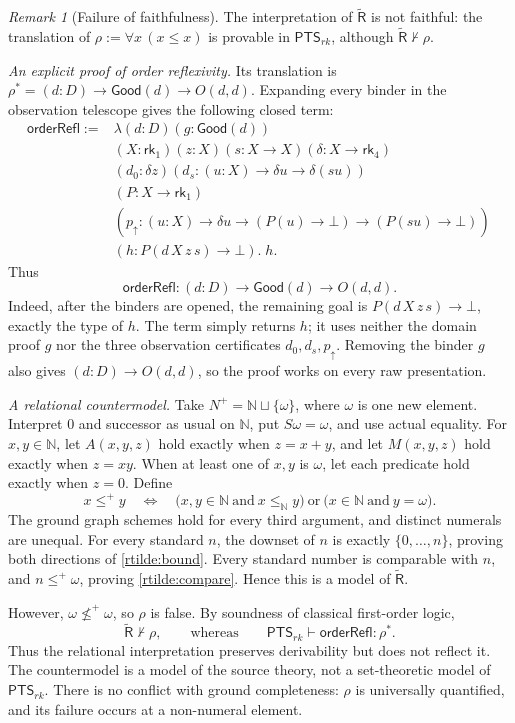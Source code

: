 \documentclass[11pt,a4paper]{article}
\newcommand{\rk}[1]{\mathsf{rk}_{#1}}
\newcommand{\PTS}{\mathsf{PTS}_{rk}}
\newcommand{\Rt}{\widetilde{\mathsf R}}
\newcommand{\Good}{\mathsf{Good}}
\theoremstyle{remark}\newtheorem*{remark}{Remark}
\begin{document}
\begin{remark}[Failure of faithfulness]\label{rem:relational-nonfaithful}
The interpretation of $\Rt$ is not faithful: the translation of
$\rho:=\forall x\,(x\le x)$ is provable in $\PTS$, although $\Rt\nvdash\rho$.

\emph{An explicit proof of order reflexivity.}
Its translation is
$\rho^*=(d:D)\to\Good(d)\to O(d,d)$. Expanding every binder in the
observation telescope gives the following closed term:
\[
\begin{aligned}
 \mathsf{orderRefl}:={}&\lambda(d:D)(g:\Good(d))\,\\
 &(X:\rk1)(z:X)(s:X\to X)(\delta:X\to\rk4)\,\\
 &(d_0:\delta z)(d_s:(u:X)\to\delta u\to\delta(su))\,\\
 &(P:X\to\rk1)\,\\
 &(p_{\uparrow}:(u:X)\to\delta u\to
       (P(u)\to\bot)\to(P(su)\to\bot))\,\\
 &(h:P(d\,X\,z\,s)\to\bot).\;h.
\end{aligned}
\]
Thus
\begin{equation}
 \mathsf{orderRefl}:(d:D)\to\Good(d)\to O(d,d).
 \label{eq:order-reflexivity}
\end{equation}
Indeed, after the binders are opened, the remaining goal is
$P(d\,X\,z\,s)\to\bot$, exactly the type of $h$. The term simply returns
$h$; it uses neither the domain proof $g$ nor the three observation
certificates $d_0,d_s,p_{\uparrow}$. Removing the binder $g$ also gives
$(d:D)\to O(d,d)$, so the proof works on every raw presentation.

\emph{A relational countermodel.}
Take $N^+=\mathbb N\sqcup\{\omega\}$, where $\omega$ is one new element.
Interpret $0$ and successor as usual on $\mathbb N$, put $S\omega=\omega$,
and use actual equality. For $x,y\in\mathbb N$, let $A(x,y,z)$ hold exactly
when $z=x+y$, and let $M(x,y,z)$ hold exactly when $z=xy$. When at least one
of $x,y$ is $\omega$, let each predicate hold exactly when $z=0$. Define
\[
 x\le^+ y\quad\Longleftrightarrow\quad
 \bigl(x,y\in\mathbb N\ \text{and}\ x\le_{\mathbb N}y\bigr)
 \ \text{or}\ \bigl(x\in\mathbb N\ \text{and}\ y=\omega\bigr).
\]
The ground graph schemes hold for every third argument, and distinct numerals
are unequal. For every standard $n$, the downset of $n$ is exactly
$\{0,\ldots,n\}$, proving both directions of \eqref{rtilde:bound}.
Every standard number is comparable with $n$, and $n\le^+\omega$, proving
\eqref{rtilde:compare}. Hence this is a model of $\Rt$.

However, $\omega\not\le^+\omega$, so $\rho$ is false. By soundness of
classical first-order logic,
\[
 \Rt\nvdash\rho,
 \qquad\text{whereas}\qquad \PTS\vdash\mathsf{orderRefl}:\rho^*.
\]
Thus the relational interpretation preserves derivability but does not
reflect it. The countermodel is a model of the source theory, not a
set-theoretic model of $\PTS$. There is no conflict with ground completeness:
$\rho$ is universally quantified, and its failure occurs at a non-numeral
element.
\end{remark}
\end{document}
